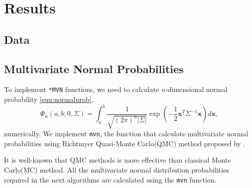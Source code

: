 \section{Results}

\subsection{Data}


\subsection{Multivariate Normal Probabilities} 

To implement \texttt{*MVN} functions, we need to calculate $n$-dimensional normal probability \eqref{eqn:normalprob},
$$
\Phi_n(a, b; 0, \Sigma) = \int_a^b \frac{1}{\sqrt{(2\pi)^n |\Sigma|}} \exp\left( -\frac{1}{2} \mathbf{x}^T \Sigma^{-1} \mathbf{x} \right) d\mathbf{x},
$$ 
numerically. We implement \texttt{mvn}, the function that calculate multivariate normal probabilities using Richtmyer Quasi-Monte Carlo(QMC) method proposed by \citet{genz2009computation}.


It is well-known that QMC methods is more effective than classical Monte Carlo(MC) method. All the multivariate normal distribution probabilities required in the next algorithms are calculated using the \texttt{mvn} function.

